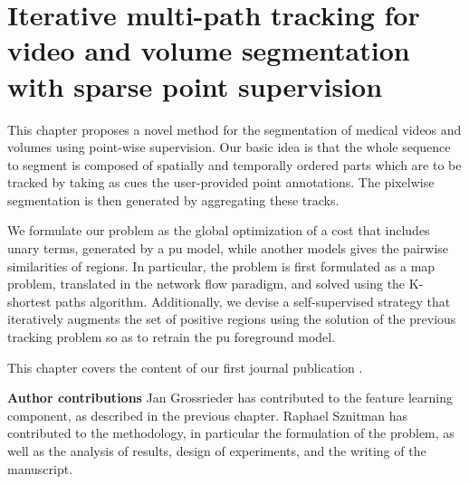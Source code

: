\newcommand{\fatline}{\Xhline{4\arrayrulewidth}}
\newcommand{\slimline}{\Xhline{1\arrayrulewidth}}
\newcommand\mycommfont[1]{\footnotesize\ttfamily{#1}}

\newcommand{\eg}{\textit{e.g. }}
\newcommand{\ie}{\textit{i.e. }}  
 
\newcommand{\KSP}[0]{{\bf KSPTrack}}
\newcommand{\KSPOPT}[0]{{\bf KSPTrack$^{opt}$ }}

\newcommand{\KSPnb}[0]{{KSPTrack }}
\newcommand{\KSPOPTnb}[0]{{KSPTrack$^{opt}$ }}

\newcommand{\EEL}[0]{{\bf EEL}}
\newcommand{\PSVM}[0]{{\bf P-SVM}}
\newcommand{\GS}[0]{{\bf Gaze2Segment}}
\newcommand{\DL}[0]{{\bf DL-prior}}

\newcommand{\EELnb}[0]{{EEL}}
\newcommand{\PSVMnb}[0]{{P-SVM}}
\newcommand{\GSnb}[0]{{Gaze2Segment}}
\newcommand{\DLnb}[0]{{DL-prior}}

\newcommand{\red}[1]{#1}
\newcommand{\blue}[1]{#1}

\chapter{Iterative multi-path tracking for video and volume segmentation with sparse point supervision }
\label{ch:ksp}
\glsresetall

This chapter proposes a novel method for the segmentation of medical videos and volumes using point-wise supervision.
Our basic idea is that the whole sequence to segment is composed of spatially and temporally ordered parts which are to be tracked by taking as cues the user-provided point annotations.
The pixelwise segmentation is then generated by aggregating these tracks.

We formulate our problem as the global optimization of a cost that includes unary terms, generated by a \gls{pu} model, while another models gives the pairwise similarities of regions.
In particular, the problem is first formulated as a \gls{map} problem, translated in the network flow paradigm, and solved using the K-shortest paths algorithm.
Additionally, we devise a self-supervised strategy that iteratively augments the set of positive regions using the solution of the previous tracking problem so as to retrain the \gls{pu} foreground model.

This chapter covers the content of our first journal publication \cite{lejeune18}.

\textbf{Author contributions} Jan Grossrieder has contributed to the feature learning component, as described in the previous chapter.
Raphael Sznitman has contributed to the methodology, in particular the formulation of the problem, as well as the analysis of results, design of experiments, and the writing of the manuscript.

